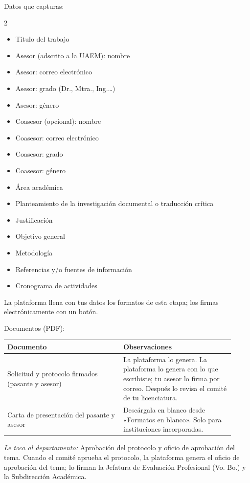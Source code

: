 Datos que capturas:
\begin{multicols}{2}\small
\begin{itemize}
  \item Título del trabajo
  \item Asesor (adscrito a la UAEM): nombre
  \item Asesor: correo electrónico
  \item Asesor: grado (Dr., Mtra., Ing.…)
  \item Asesor: género
  \item Coasesor (opcional): nombre
  \item Coasesor: correo electrónico
  \item Coasesor: grado
  \item Coasesor: género
  \item Área académica
  \item Planteamiento de la investigación documental o traducción crítica
  \item Justificación
  \item Objetivo general
  \item Metodología
  \item Referencias y/o fuentes de información
  \item Cronograma de actividades
\end{itemize}
\end{multicols}

La plataforma llena con tus datos los formatos de esta etapa; los firmas electrónicamente con un botón.

Documentos (PDF):
{\small\begin{longtable}{>{\raggedright\arraybackslash}p{0.47\linewidth}>{\raggedright\arraybackslash}p{0.45\linewidth}}
\toprule
\textbf{Documento} & \textbf{Observaciones}\\
\midrule
\endhead
Solicitud y protocolo firmados (pasante y asesor) & La plataforma lo genera. La plataforma lo genera con lo que escribiste; tu asesor lo firma por correo. Después lo revisa el comité de tu licenciatura.\\
Carta de presentación del pasante y asesor & Descárgala en blanco desde «Formatos en blanco». Solo para instituciones incorporadas.\\
\bottomrule
\end{longtable}}

\emph{Le toca al departamento:} Aprobación del protocolo y oficio de aprobación del tema. Cuando el comité aprueba el protocolo, la plataforma genera el oficio de aprobación del tema; lo firman la Jefatura de Evaluación Profesional (Vo. Bo.) y la Subdirección Académica.
